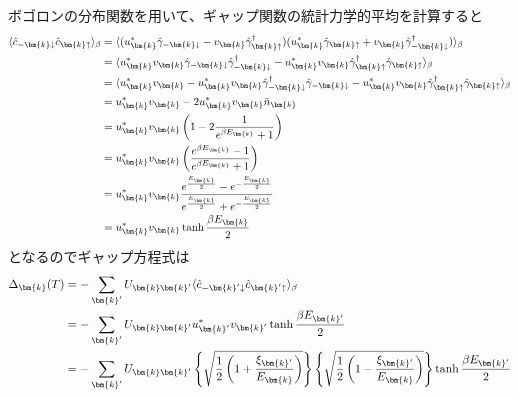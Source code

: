 \documentclass[dvipdfmx, 11pt, a4paper]{jsarticle}
\numberwithin{equation}{section}
\theoremstyle{definition}
\begin{document}
    \begin{derivationBox}
        ボゴロンの分布関数を用いて、ギャップ関数の統計力学的平均を計算すると
        \begin{align}
            \langle \hat{c}_{-\bm{k}\downarrow} \hat{c}_{\bm{k}\uparrow} \rangle_{\beta} &= \langle (u_{\bm{k}}^* \hat{\gamma}_{-\bm{k}\downarrow} - v_{\bm{k}}\hat{\gamma}_{\bm{k}\uparrow}^\dagger)(u_{\bm{k}}^* \hat{\gamma}_{\bm{k}\uparrow} + v_{\bm{k}} \hat{\gamma}_{-\bm{k}\downarrow}^\dagger  ) \rangle_{\beta} \notag \\
            &= \langle u_{\bm{k}}^* v_{\bm{k}} \hat{\gamma}_{-\bm{k}\downarrow}  \hat{\gamma}_{-\bm{k}\downarrow}^\dagger -  u_{\bm{k}}^*v_{\bm{k}}\hat{\gamma}_{\bm{k}\uparrow}^\dagger  \hat{\gamma}_{\bm{k}\uparrow} \rangle_{\beta}  \notag \\
            &= \langle u_{\bm{k}}^* v_{\bm{k}} -  u_{\bm{k}}^* v_{\bm{k}} \hat{\gamma}_{-\bm{k}\downarrow}^\dagger \hat{\gamma}_{-\bm{k}\downarrow}   -  u_{\bm{k}}^*v_{\bm{k}}\hat{\gamma}_{\bm{k}\uparrow}^\dagger  \hat{\gamma}_{\bm{k}\uparrow} \rangle_{\beta} \notag \\
            &= u_{\bm{k}}^* v_{\bm{k}} -2u_{\bm{k}}^* v_{\bm{k}}\bar{n}_{\bm{k}} \notag \\
            &= u_{\bm{k}}^* v_{\bm{k}} \left( 1 -2 \frac{1}{e^{\beta E_{\bm{k}}}+1} \right) \notag \\
            &= u_{\bm{k}}^* v_{\bm{k}} \left( \frac{e^{\beta E_{\bm{k}}} - 1}{e^{\beta E_{\bm{k}}}+1} \right) \notag \\
            &= u_{\bm{k}}^* v_{\bm{k}} \frac{e^{ \frac{E_{\bm{k}}}{2}} - e^{- \frac{E_{\bm{k}}}{2}}}{e^{ \frac{E_{\bm{k}}}{2}} + e^{- \frac{E_{\bm{k}}}{2}}} \notag \\
            &= u_{\bm{k}}^* v_{\bm{k}} \tanh \frac{\beta E_{\bm{k}}}{2}
        \end{align}
        となるのでギャップ方程式は
        \begin{align}
            \Delta_{\bm{k}}(T) &= -\sum_{\bm{k}'} U_{\bm{k}\bm{k}'} \langle \hat{c}_{-\bm{k}'\downarrow} \hat{c}_{\bm{k}'\uparrow} \rangle_{\beta} \notag \\
            &= -\sum_{\bm{k}'} U_{\bm{k}\bm{k}'} u_{\bm{k}'}^* v_{\bm{k}'} \tanh \frac{\beta E_{\bm{k}'}}{2} \notag \\
            &= -\sum_{\bm{k}'} U_{\bm{k}\bm{k}'} \left\{ \sqrt{\frac{1}{2}\left( 1 + \frac{\xi_{\bm{k}'}}{E_{\bm{k}}} \right)} \right\} \left\{ \sqrt{\frac{1}{2}\left( 1 - \frac{\xi_{\bm{k}'}}{E_{\bm{k}}} \right)} \right\}  \tanh \frac{\beta E_{\bm{k}'}}{2} \notag \\

\end{align}
\end{derivationBox}
\end{document}
